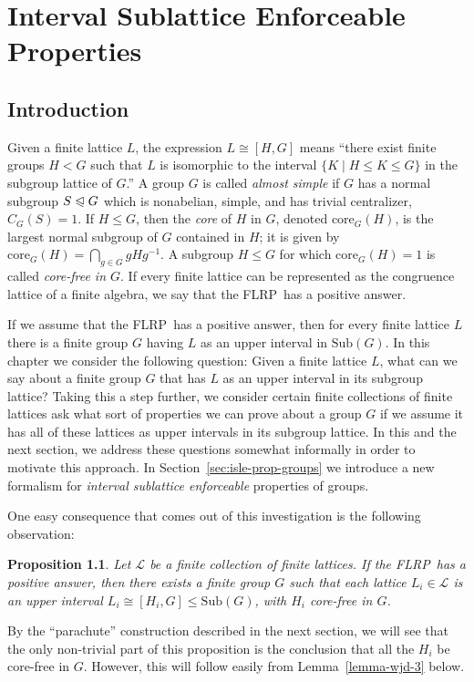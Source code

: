 \documentclass[cm,dissertation]{uhthesis}
\theoremstyle{plain}
\newtheorem{prop}[theorem]{Proposition}
\theoremstyle{definition}
\theoremstyle{remark}
\numberwithin{theorem}{section}
\numberwithin{claim}{chapter}
\numberwithin{equation}{section}
\numberwithin{conjecture}{chapter}
\newcommand{\<}{\ensuremath{\langle}}
\renewcommand{\>}{\ensuremath{\rangle}}
\renewcommand{\leq}{\ensuremath{\leqslant}}
\newcommand{\subnormal}{\ensuremath{\trianglelefteqslant}}
\newcommand{\Sub}{\ensuremath{\mathrm{Sub}}}
\newcommand{\core}{\ensuremath{\mathrm{core}}}
\newcommand{\FLRP}{{\small FLRP}}
\newcommand{\0}{\ensuremath{\mathbf{0}}}
\newcommand{\1}{\ensuremath{\mathbf{1}}}
\newcommand{\2}{\ensuremath{\mathbf{2}}}
\newcommand{\3}{\ensuremath{\mathbf{3}}}
\newcommand{\4}{\ensuremath{\mathbf{4}}}
\newcommand{\5}{\ensuremath{\mathbf{5}}}
\newcommand{\sL}{\ensuremath{\mathscr{L}}}
\begin{document}
\chapter{Interval Sublattice Enforceable Properties}
\label{cha:subl-interv-enforc}
\section{Introduction}
Given a finite lattice $L$, the
expression $L \cong [H, G]$ means ``there exist finite groups $H < G$ such that 
$L$ is isomorphic to the interval $\{K \mid H\leq K \leq G\}$ in
the subgroup lattice of $G$.''  
A group $G$ is called \emph{almost simple} if $G$ has a normal subgroup $S \subnormal
G$ which is nonabelian, simple, and has trivial centralizer, $C_G(S) = 1$.
If $H \leq G$, then the
\emph{core} of $H$ in $G$, denoted $\core_G(H)$, is the largest normal subgroup of $G$
contained in $H$; it is given by  $\core_G(H) = \bigcap\limits_{g\in G} gHg^{-1}$.
A subgroup $H\leq G$ for which $\core_G(H)=1$ is called \emph{core-free in $G$}.
If every finite lattice can be represented as the congruence lattice of a finite
algebra, we say that the \FLRP\ has a positive answer.

If we assume that the \FLRP\ has a positive answer, then for every finite
lattice $L$ there is a finite group $G$ having $L$ as an upper interval in
$\Sub(G)$. 
In this chapter we consider the following question: Given a finite lattice $L$,
what can we say about a finite group $G$ that has  $L$
as an upper interval in its subgroup lattice?
Taking this a step further, we consider certain finite collections of finite 
lattices ask what sort of properties we can prove about a
group $G$ if we assume it has all of these lattices as 
upper intervals in its subgroup lattice.  In this and the next section, we
address these questions somewhat informally in order to motivate this
approach. In Section~\ref{sec:isle-prop-groups} we introduce a 
new formalism for \emph{interval sublattice enforceable} properties of
groups. 

One easy consequence that comes out of this investigation is the following observation:
\begin{prop}
\label{prop:parachute}
  Let $\sL$ be a finite collection of finite lattices.
  If the \FLRP\ has a positive answer, then there exists a finite group $G$ such
  that each lattice $L_i \in \sL$ is an upper interval $L_i\cong [H_i, G] \leq
  \Sub(G)$, with $H_i$ core-free in $G$. 
\end{prop}
By the ``parachute'' construction described in the next section,
we will see that the only non-trivial part of this proposition is the conclusion
that all the $H_i$ be core-free in $G$.  However, this will follow easily from
Lemma~\ref{lemma-wjd-3} below.  
\end{document}
